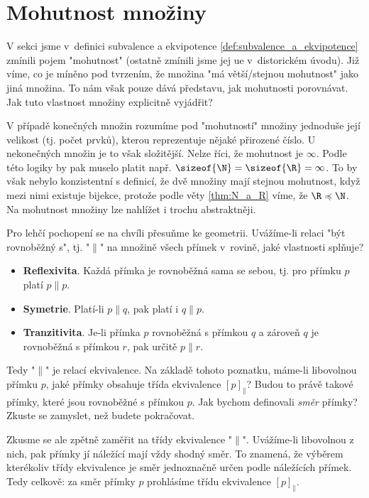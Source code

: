 \section{Mohutnost množiny}\label{sec:mohutnost_mnoziny}
V sekci jsme v~definici subvalence a ekvipotence \ref{def:subvalence_a_ekvipotence} zmínili pojem "mohutnost" (ostatně zmínili jsme jej ue v~distorickém úvodu). Již víme, co je míněno pod tvrzením, že množina "má větší/stejnou mohutnost" jako jiná množina. To nám však pouze dává představu, jak mohutnosti porovnávat. Jak tuto vlastnost množiny explicitně vyjádřit?\par
V případě konečných množin rozumíme pod "mohutností" množiny jednoduše její velikost (tj. počet prvků), kterou reprezentuje nějaké přirozené číslo. U nekonečných množin je to však složitější. Nelze říci, že mohutnost je $\infty$. Podle této logiky by pak muselo platit např. $\sizeof{\N}=\sizeof{\R}=\infty$. To by však nebylo konzistentní s definicí, že dvě množiny mají stejnou mohutnost, když mezi nimi existuje bijekce, protože podle věty \ref{thm:N_a_R} víme, že $\R\preccurlyeq\N$. Na mohutnost množiny lze nahlížet i trochu abstraktněji.
\medskip

Pro lehčí pochopení se na chvíli přesuňme ke geometrii. Uvážíme-li relaci "být rovnoběžný s", tj. "$\parallel$" na množině všech přímek v~rovině, jaké vlastnosti splňuje?
\begin{itemize}
    \item \textbf{Reflexivita}. Každá přímka je rovnoběžná sama se sebou, tj. pro přímku $p$ platí $p\parallel p$.
    \item \textbf{Symetrie}. Platí-li $p\parallel q$, pak platí i $q\parallel p$.
    \item \textbf{Tranzitivita}. Je-li přímka $p$ rovnoběžná s přímkou $q$ a zároveň $q$ je rovnoběžná s přímkou $r$, pak určitě $p\parallel r$.
\end{itemize}
Tedy "$\parallel$" je relací ekvivalence. Na základě tohoto poznatku, máme-li libovolnou přímku $p$, jaké přímky obsahuje třída ekvivalence $[p]_\parallel$? Budou to právě takové přímky, které jsou rovnoběžné s přímkou $p$. Jak bychom definovali \emph{směr} přímky? Zkuste se zamyslet, než budete pokračovat.\par
Zkusme se ale zpětně zaměřit na třídy ekvivalence "$\parallel$". Uvážíme-li libovolnou z nich, pak přímky jí náležící mají vždy shodný směr. To znamená, že výběrem kterékoliv třídy ekvivalence je směr jednoznačně určen podle náležících přímek. Tedy celkově: za směr přímky $p$ prohlásíme třídu ekvivalence $[p]_\parallel$.
\medskip

